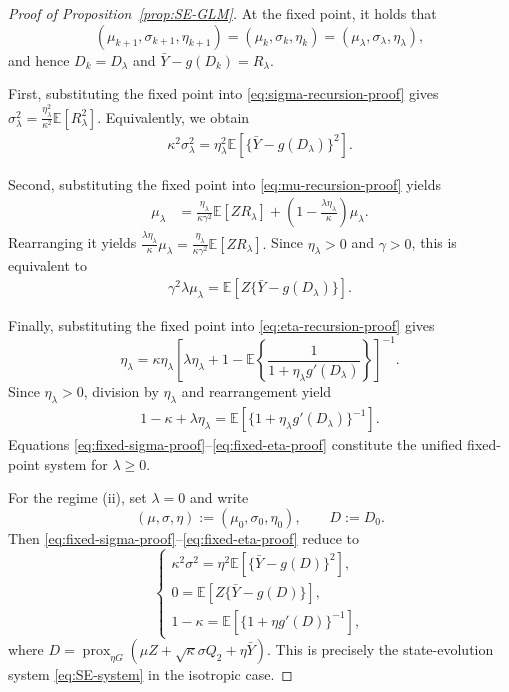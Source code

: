 \documentclass[12pt,reqno]{amsart}
\begin{document}
{\begin{proof}[Proof of Proposition~\ref{prop:SE-GLM}]
At the fixed point, it holds that
\[
(\mu_{k+1},\sigma_{k+1},\eta_{k+1})
=
(\mu_k,\sigma_k,\eta_k)
=
(\mu_\lambda,\sigma_\lambda,\eta_\lambda),
\]
and hence $D_k=D_\lambda$ and
$\bar Y-g(D_k)=R_\lambda$.

First, substituting the fixed point into
\eqref{eq:sigma-recursion-proof} gives
$
\sigma_\lambda^2
=
\frac{\eta_\lambda^2}{\kappa^2}
\mathbb{E}[R_\lambda^2].
$
Equivalently, we obtain
\begin{align}
\kappa^2\sigma_\lambda^2
=
\eta_\lambda^2
\mathbb{E}
\left[
\{\bar Y-g(D_\lambda)\}^2
\right].
\label{eq:fixed-sigma-proof}
\end{align}

Second, substituting the fixed point into
\eqref{eq:mu-recursion-proof} yields
\begin{align*}
\mu_\lambda
&=
\frac{\eta_\lambda}{\kappa\gamma^2}
\mathbb{E}[ZR_\lambda]
+
\left(
1-\frac{\lambda\eta_\lambda}{\kappa}
\right)\mu_\lambda.
\end{align*}
Rearranging it yields
$
\frac{\lambda\eta_\lambda}{\kappa}\mu_\lambda
=
\frac{\eta_\lambda}{\kappa\gamma^2}
\mathbb{E}[ZR_\lambda].
$
Since $\eta_\lambda>0$ and $\gamma>0$, this is equivalent to
\begin{align}
\gamma^2\lambda\mu_\lambda
=
\mathbb{E}
\left[
Z\{\bar Y-g(D_\lambda)\}
\right].
\label{eq:fixed-mu-proof}
\end{align}

Finally, substituting the fixed point into
\eqref{eq:eta-recursion-proof} gives
\[
\eta_\lambda
=
\kappa\eta_\lambda
\left[
\lambda\eta_\lambda+1
-
\mathbb{E}
\left\{
\frac{1}{1+\eta_\lambda g'(D_\lambda)}
\right\}
\right]^{-1}.
\]
Since $\eta_\lambda>0$, division by $\eta_\lambda$ and rearrangement yield
\begin{align}
1-\kappa+\lambda\eta_\lambda
=
\mathbb{E}
\left[
\{1+\eta_\lambda g'(D_\lambda)\}^{-1}
\right].
\label{eq:fixed-eta-proof}
\end{align}
Equations
\eqref{eq:fixed-sigma-proof}--\eqref{eq:fixed-eta-proof}
constitute the unified fixed-point system for $\lambda\ge0$.

For the regime (ii), set $\lambda=0$ and write
\[
(\mu,\sigma,\eta)
:=
(\mu_0,\sigma_0,\eta_0),
\qquad
D:=D_0.
\]
Then \eqref{eq:fixed-sigma-proof}--\eqref{eq:fixed-eta-proof} reduce to
\[
\begin{cases}
\kappa^2\sigma^2
=
\eta^2
\mathbb{E}
\left[
\{\bar Y-g(D)\}^2
\right],
\\[1mm]
0
=
\mathbb{E}
\left[
Z\{\bar Y-g(D)\}
\right],
\\[1mm]
1-\kappa
=
\mathbb{E}
\left[
\{1+\eta g'(D)\}^{-1}
\right],
\end{cases}
\]
where
$
D
=
\operatorname{prox}_{\eta G}
\left(
\mu Z+\sqrt{\kappa}\sigma Q_2+\eta\bar Y
\right).
$
This is precisely the state-evolution system
\eqref{eq:SE-system} in the isotropic case.


\end{proof}}
\end{document}

